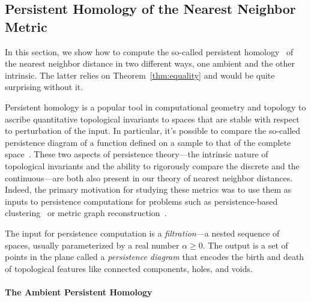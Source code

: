 \subsection{Persistent Homology of the Nearest Neighbor Metric}
  \label{sec:homology}


  In this section, we show how to compute the so-called persistent homology~\cite{edelsbrunner02topological} of the nearest neighbor distance in two different ways, one ambient and the other intrinsic.
  The latter relies on Theorem~\ref{thm:equality} and would be quite surprising without it.

  Persistent homology is a popular tool in computational geometry and topology to ascribe quantitative topological invariants to spaces that are stable with respect to perturbation of the input.
  In particular, it's possible to compare the so-called persistence diagram of a function defined on a sample to that of the complete space~\cite{chazal08towards}.
  These two aspects of persistence theory---the intrinsic nature of topological invariants and the ability to rigorously compare the discrete and the continuous---are both also present in our theory of nearest neighbor distances.
  Indeed, the primary motivation for studying these metrics was to use them as inputs to persistence computations for problems such as persistence-based clustering~\cite{chazal13persistence} or metric graph reconstruction~\cite{aanjaneya12metric}.

  The input for persistence computation is a \emph{filtration}---a nested sequence of spaces, usually parameterized by a real number $\alpha\ge 0$.
  The output is a set of points in the plane called a \emph{persistence diagram} that encodes the birth and death of topological features like connected components, holes, and voids.

  \paragraph*{The Ambient Persistent Homology}

